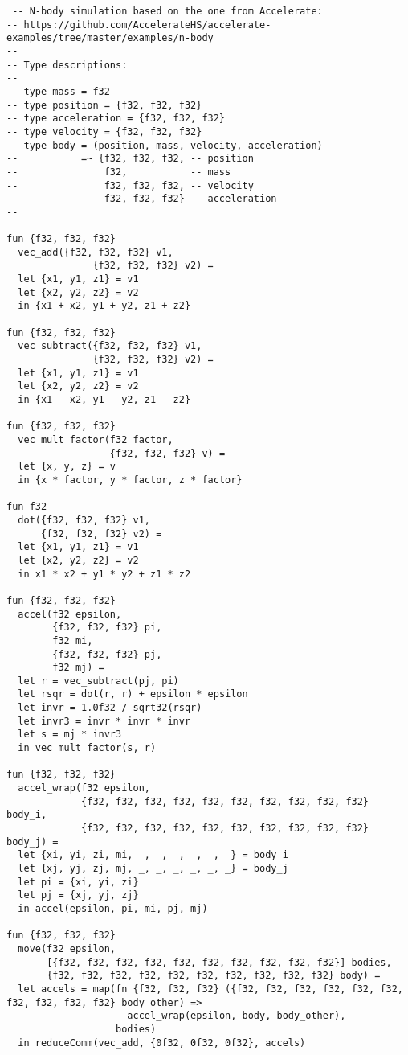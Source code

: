 \begin{lstlisting}
 -- N-body simulation based on the one from Accelerate:
-- https://github.com/AccelerateHS/accelerate-examples/tree/master/examples/n-body
--
-- Type descriptions:
--
-- type mass = f32
-- type position = {f32, f32, f32}
-- type acceleration = {f32, f32, f32}
-- type velocity = {f32, f32, f32}
-- type body = (position, mass, velocity, acceleration)
--           =~ {f32, f32, f32, -- position
--               f32,           -- mass
--               f32, f32, f32, -- velocity
--               f32, f32, f32} -- acceleration
--

fun {f32, f32, f32}
  vec_add({f32, f32, f32} v1,
               {f32, f32, f32} v2) =
  let {x1, y1, z1} = v1
  let {x2, y2, z2} = v2
  in {x1 + x2, y1 + y2, z1 + z2}

fun {f32, f32, f32}
  vec_subtract({f32, f32, f32} v1,
               {f32, f32, f32} v2) =
  let {x1, y1, z1} = v1
  let {x2, y2, z2} = v2
  in {x1 - x2, y1 - y2, z1 - z2}

fun {f32, f32, f32}
  vec_mult_factor(f32 factor,
                  {f32, f32, f32} v) =
  let {x, y, z} = v
  in {x * factor, y * factor, z * factor}

fun f32
  dot({f32, f32, f32} v1,
      {f32, f32, f32} v2) =
  let {x1, y1, z1} = v1
  let {x2, y2, z2} = v2
  in x1 * x2 + y1 * y2 + z1 * z2
  
fun {f32, f32, f32}
  accel(f32 epsilon,
        {f32, f32, f32} pi,
        f32 mi,
        {f32, f32, f32} pj,
        f32 mj) =
  let r = vec_subtract(pj, pi)
  let rsqr = dot(r, r) + epsilon * epsilon
  let invr = 1.0f32 / sqrt32(rsqr)
  let invr3 = invr * invr * invr
  let s = mj * invr3
  in vec_mult_factor(s, r)

fun {f32, f32, f32}
  accel_wrap(f32 epsilon,
             {f32, f32, f32, f32, f32, f32, f32, f32, f32, f32} body_i,
             {f32, f32, f32, f32, f32, f32, f32, f32, f32, f32} body_j) =
  let {xi, yi, zi, mi, _, _, _, _, _, _} = body_i
  let {xj, yj, zj, mj, _, _, _, _, _, _} = body_j
  let pi = {xi, yi, zi}
  let pj = {xj, yj, zj}
  in accel(epsilon, pi, mi, pj, mj)
  
fun {f32, f32, f32}
  move(f32 epsilon,
       [{f32, f32, f32, f32, f32, f32, f32, f32, f32, f32}] bodies,
       {f32, f32, f32, f32, f32, f32, f32, f32, f32, f32} body) =
  let accels = map(fn {f32, f32, f32} ({f32, f32, f32, f32, f32, f32, f32, f32, f32, f32} body_other) =>
                     accel_wrap(epsilon, body, body_other),
                   bodies)
  in reduceComm(vec_add, {0f32, 0f32, 0f32}, accels)


\end{lstlisting}
